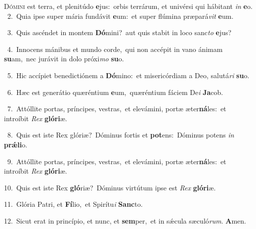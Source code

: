 \lettrine{\initial\textcolor{\initialcolor}{D}}{ómini} est terra, et plenitúdo \textbf{e}\-jus:~\star orbis terrárum, et univérsi qui hábitant \textit{in} \textbf{e}\-o.\\
{\numbfont\textcolor{\numbcolor}{~2.}}~Quia ipse super mária fundávit \textbf{e}\-um:~\star et super flúmina præpará\textit{vit} \textbf{e}\-um.\par
{\numbfont\textcolor{\numbcolor}{~3.}}~Quis ascéndet in montem \textbf{Dó}\-mini?~\star aut quis stabit in loco sanc\textit{to} \textbf{e}\-jus?\par
{\numbfont\textcolor{\numbcolor}{~4.}}~Innocens mánibus et mundo corde,~\dagger qui non accépit in vano ánimam \textbf{su}\-am,~\star nec jurávit in dolo próxi\textit{mo} \textbf{su}\-o.\par
{\numbfont\textcolor{\numbcolor}{~5.}}~Hic accípiet benedictiónem a \textbf{Dó}\-mino:~\star et misericórdiam a Deo, salutá\textit{ri} \textbf{su}\-o.\par
{\numbfont\textcolor{\numbcolor}{~6.}}~Hæc est generátio quæréntium \textbf{e}\-um,~\star quæréntium fáciem De\textit{i} \textbf{Ja}\-cob.\par
{\numbfont\textcolor{\numbcolor}{~7.}}~Attóllite portas, príncipes, vestras,~\dagger et elevámini, portæ æter\-\textbf{ná}\-les:~\star et introíbit \textit{Rex} \textbf{gló}\-\textbf{ri}æ.\par
{\numbfont\textcolor{\numbcolor}{~8.}}~Quis est iste Rex glóriæ?~\dagger Dóminus fortis et \textbf{pot}\-ens:~\star Dóminus potens \textit{in} \textbf{prǽ}\-\textbf{li}o.\par
{\numbfont\textcolor{\numbcolor}{~9.}}~Attóllite portas, príncipes, vestras,~\dagger et elevámini, portæ æter\-\textbf{ná}\-les:~\star et introíbit \textit{Rex} \textbf{gló}\-\textbf{ri}æ.\par
{\numbfont\textcolor{\numbcolor}{10.}}~Quis est iste Rex \textbf{gló}\-riæ?~\star Dóminus virtútum ipse est \textit{Rex} \textbf{gló}\-\textbf{ri}æ.\par
{\numbfont\textcolor{\numbcolor}{11.}}~Glória Patri, et \textbf{Fí}\-lio,~\star et Spirítu\textit{i} \textbf{Sanc}\-to.\par
{\numbfont\textcolor{\numbcolor}{12.}}~Sicut erat in princípio, et nunc, et \textbf{sem}\-per,~\star et in sǽcula sæculó\-\textit{rum}\-. \textbf{A}\-men.\par
